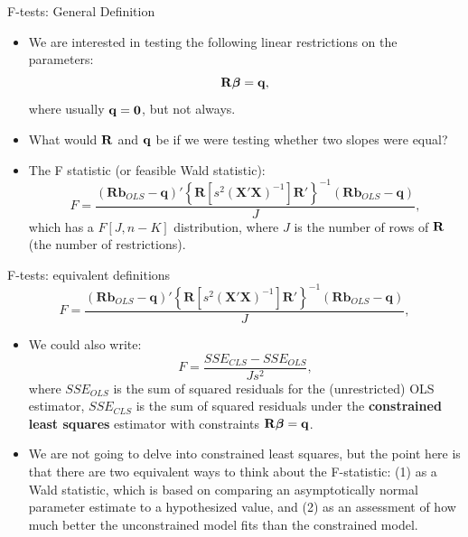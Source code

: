 \begin{frame}{F-tests: General Definition}
\begin{itemize}
	\item We are interested in testing the following linear restrictions on the parameters:\[
	{\bf R} \boldsymbol{\beta} = {\bf q}, 
	\]
	where usually $ {\bf q} = {\bf 0}$, but not always.

	\item What would ${\bf R}$ and ${\bf q}$ be if we were testing whether two slopes were equal?

	\item The F statistic (or feasible Wald statistic):\[
F=\frac{\left(\boldsymbol{R}\boldsymbol{b}_{OLS}-\boldsymbol{q}\right)'\left\{ \boldsymbol{R}\left[s^{2}\left(\boldsymbol{X}'\boldsymbol{X}\right)^{-1}\right]\boldsymbol{R}'\right\} ^{-1}\left(\boldsymbol{R}\boldsymbol{b}_{OLS}-\boldsymbol{q}\right)}{J},
\]
which has a $F\left[J,n-K\right]$ distribution, where $J$ is the number of rows of ${\bf R}$ (the number of restrictions).

\end{itemize}
\end{frame}

\begin{frame}{F-tests: equivalent definitions}
\[
F=\frac{\left(\boldsymbol{R}\boldsymbol{b}_{OLS}-\boldsymbol{q}\right)'\left\{ \boldsymbol{R}\left[s^{2}\left(\boldsymbol{X}'\boldsymbol{X}\right)^{-1}\right]\boldsymbol{R}'\right\} ^{-1}\left(\boldsymbol{R}\boldsymbol{b}_{OLS}-\boldsymbol{q}\right)}{J},
\]
\begin{itemize}
	\item We could also write:\[
		F = \frac{SSE_{CLS} - SSE_{OLS}}{Js^2},
	\]
	where $SSE_{OLS}$ is the sum of squared residuals for the (unrestricted) OLS estimator, $SSE_{CLS}$
	is the sum of squared residuals under the {\bf constrained least squares} estimator with constraints ${\bf R} \boldsymbol{\beta} = {\bf q}$.

	\item We are not going to delve into constrained least squares, but the point here is that there are two equivalent ways to think about
	the F-statistic: (1) as a Wald statistic, which is based on comparing an asymptotically normal parameter estimate to a hypothesized value, 
	and (2) as an assessment of how much better the unconstrained model fits than the constrained model. 
\end{itemize}
\end{frame}




